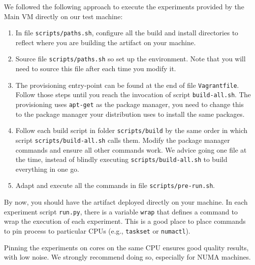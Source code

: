 \documentclass[12pt]{article}
\begin{document}
We followed the following approach to execute the experiments provided by the
Main VM directly on our test machine:

\begin{enumerate}

    \item In file \texttt{scripts/paths.sh}, configure all the build and install
        directories to reflect where you are building the artifact on your
        machine.

    \item Source file \texttt{scripts/paths.sh} so set up the environment.  Note
        that you will need to source this file after each time you modify it.

    \item The provisioning entry-point can be found at the end of file
        \texttt{Vagrantfile}.  Follow those steps until you reach the invocation
        of script \texttt{build-all.sh}. The provisioning uses \texttt{apt-get}
        as the package manager, you need to change this to the package manager
        your distribution uses to install the same packages.

    \item Follow each build script in folder \texttt{scripts/build} by the same
        order in which script \texttt{scripts/build-all.sh} calls them.  Modify
        the package manager commands and ensure all other commands work.  We
        advice going one file at the time, instead of blindly executing
        \texttt{scripts/build-all.sh} to build everything in one go.

    \item Adapt and execute all the commands in file
        \texttt{scripts/pre-run.sh}.

\end{enumerate}

By now, you should have the artifact deployed directly on your machine.  In each
experiment script \texttt{run.py}, there is a variable \texttt{wrap} that
defines a command to wrap the execution of each experiment.  This is a good
place to place commands to pin process to particular CPUs (e.g.,
\texttt{taskset} or \texttt{numactl}).

Pinning the experiments on cores on the same CPU ensures good quality results,
with low noise.  We strongly recommend doing so, especially for NUMA machines.
\end{document}
